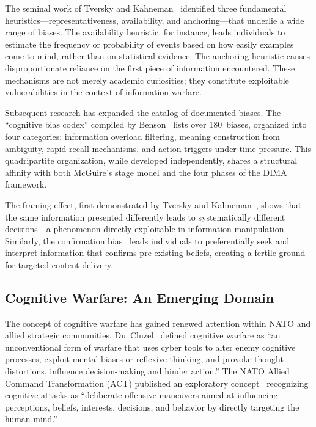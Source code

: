 \documentclass[11pt,a4paper]{article}
\begin{document}
The seminal work of Tversky and Kahneman~\cite{tversky1974} identified three fundamental heuristics---representativeness, availability, and anchoring---that underlie a wide range of biases. The availability heuristic, for instance, leads individuals to estimate the frequency or probability of events based on how easily examples come to mind, rather than on statistical evidence. The anchoring heuristic causes disproportionate reliance on the first piece of information encountered. These mechanisms are not merely academic curiosities; they constitute exploitable vulnerabilities in the context of information warfare.

Subsequent research has expanded the catalog of documented biases. The ``cognitive bias codex'' compiled by Benson~\cite{benson2016} lists over 180~biases, organized into four categories: information overload filtering, meaning construction from ambiguity, rapid recall mechanisms, and action triggers under time pressure. This quadripartite organization, while developed independently, shares a structural affinity with both McGuire's stage model and the four phases of the DIMA framework.

The framing effect, first demonstrated by Tversky and Kahneman~\cite{tversky1981}, shows that the same information presented differently leads to systematically different decisions---a phenomenon directly exploitable in information manipulation. Similarly, the confirmation bias~\cite{nickerson1998} leads individuals to preferentially seek and interpret information that confirms pre-existing beliefs, creating a fertile ground for targeted content delivery.

\subsection{Cognitive Warfare: An Emerging Domain}

The concept of cognitive warfare has gained renewed attention within NATO and allied strategic communities. Du~Cluzel~\cite{ducluzel2020} defined cognitive warfare as ``an unconventional form of warfare that uses cyber tools to alter enemy cognitive processes, exploit mental biases or reflexive thinking, and provoke thought distortions, influence decision-making and hinder action.'' The NATO Allied Command Transformation (ACT) published an exploratory concept~\cite{natoact2023} recognizing cognitive attacks as ``deliberate offensive maneuvers aimed at influencing perceptions, beliefs, interests, decisions, and behavior by directly targeting the human mind.''
\end{document}
